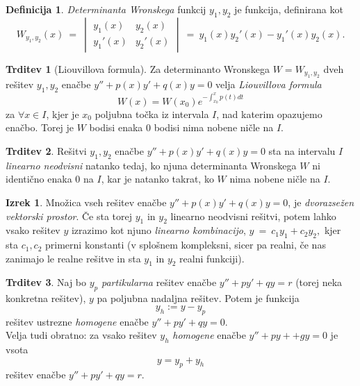 \documentclass[11pt]{article}
\theoremstyle{definition}
\newtheorem{definicija}{Definicija}[section]
\theoremstyle{definition}
\newtheorem{trditev}{Trditev}[section]
\theoremstyle{definition}
\newtheorem{izrek}{Izrek}[section]
\begin{document}
\begin{definicija}

\textit{Determinanta Wronskega} funkcij $y_1, y_2$ je funkcija, definirana kot
$$W_{y_1,y_2}(x) ~=~ \begin{vmatrix}
y_1(x) & y_2(x) \\
y_1'(x) & y_2'(x)
\end{vmatrix} ~=~ y_1(x) y_2'(x) - y_1'(x) y_2(x).$$

\end{definicija}
\vspace{0.5cm}

\begin{trditev}[Liouvillova formula]

Za determinanto Wronskega $W = W_{y_1,y_2}$ dveh rešitev $y_1, y_2$ enačbe $y'' + p(x) y' + q(x) y = 0$ velja \textit{Liouvillova formula}
$$W(x) = W(x_0) e^{-\int_{x_0}^x p(t) dt}$$
za $\forall x \in I$, kjer je $x_0$ poljubna točka iz intervala $I$, nad katerim opazujemo enačbo. Torej je $W$ bodisi enaka $0$ bodisi nima nobene ničle na $I$.

\end{trditev}
\vspace{0.5cm}

\begin{trditev}

Rešitvi $y_1, y_2$ enačbe $y'' + p(x) y' + q(x) y = 0$ sta na intervalu $I$ \textit{linearno neodvisni} natanko tedaj, ko njuna determinanta Wronskega $W$ ni identično enaka $0$ na $I$, kar je natanko takrat, ko $W$ nima nobene ničle na $I$.

\end{trditev}
\vspace{0.5cm}

\begin{izrek}

Množica vseh rešitev enačbe $y'' + p(x) y' + q(x) y = 0$, je \textit{dvorazsežen vektorski prostor}. Če sta torej $y_1$ in $y_2$ linearno neodvisni rešitvi, potem lahko vsako rešitev $y$ izrazimo kot njuno \textit{linearno kombinacijo}, 
$y ~=~ c_1 y_1 + c_2 y_2,$
kjer sta $c_1, c_2$ primerni konstanti (v splošnem kompleksni, sicer pa realni, če nas zanimajo le realne rešitve in sta $y_1$ in $y_2$ realni funkciji).

\end{izrek}
\vspace{0.5cm}

\begin{trditev}

Naj bo $y_p$ \textit{partikularna} rešitev enačbe $y'' + p y' + q y = r$ (torej neka konkretna rešitev), $y$ pa poljubna nadaljna rešitev. Potem je funkcija
$$y_h := y - y_p$$
rešitev ustrezne \textit{homogene} enačbe $y'' + p y' + q y = 0$. \\
\noindent Velja tudi obratno: za vsako rešitev $y_h$ \textit{homogene} enačbe $y'' + p y+ + g y = 0$ je vsota
$$y = y_p + y_h$$
rešitev enačbe $y'' + p y' + q y = r$.

\end{trditev}
\vspace{0.5cm}


\pagebreak

\end{document}
